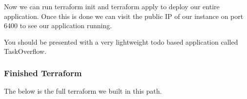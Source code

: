 \documentclass{csse4400}
\begin{document}
Now we can run terraform init and terraform apply to deploy our entire application. Once this is done we can visit the public IP of our instance on port 6400 to see our application running.


You should be presented with a very lightweight todo based application called TaskOverflow.

\subsubsection{Finished Terraform}

The below is the full terraform we built in this path.
\end{document}
